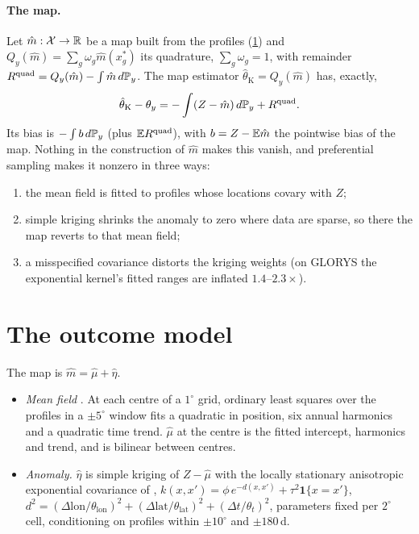 \paragraph{The map.} Let $\hat m:\mathcal{X}\to\mathbb{R}$ be a map built from the profiles (\cref{sec:outcome}) and
$Q_y(\hat m)=\sum_g\omega_g\hat m(x^*_g)$ its quadrature, $\sum_g\omega_g=1$, with remainder
$R^{\mathrm{quad}}=Q_y(\hat m)-\int\hat m\,d\mathbb{P}_y$. The map estimator $\hat\theta_{\mathrm K}=Q_y(\hat m)$
has, exactly,
\begin{equation}\label{eq:krige-error}
  \hat\theta_{\mathrm K}-\theta_y=-\int(Z-\hat m)\,d\mathbb{P}_y+R^{\mathrm{quad}} .
\end{equation}
Its bias is $-\int b\,d\mathbb{P}_y$ (plus $\mathbb{E} R^{\mathrm{quad}}$), with $b=Z-\mathbb{E}\hat m$ the pointwise bias of
the map. Nothing in the construction of $\hat m$ makes this vanish, and preferential sampling makes it
nonzero in three ways:
\begin{enumerate}
  \item the mean field is fitted to profiles whose locations covary with $Z$;
  \item simple kriging shrinks the anomaly to zero where data are sparse, so there the map reverts to
        that mean field;
  \item a misspecified covariance distorts the kriging weights (on GLORYS the exponential kernel's
        fitted ranges are inflated $1.4$--$2.3\times$).
\end{enumerate}

\section{The outcome model}\label{sec:outcome}

The map is $\hat m=\hat\mu+\hat\eta$.
\begin{itemize}
  \item \emph{Mean field} \citep[eq.~5]{sukianto2026}. At each centre of a $1^\circ$ grid, ordinary least
        squares over the profiles in a $\pm5^\circ$ window fits a quadratic in position, six annual
        harmonics and a quadratic time trend. $\hat\mu$ at the centre is the fitted intercept,
        harmonics and trend, and is bilinear between centres.
  \item \emph{Anomaly.} $\hat\eta$ is simple kriging of $Z-\hat\mu$ with the locally stationary
        anisotropic exponential covariance of \citet{kuusela2018},
        $k(x,x')=\phi\,e^{-d(x,x')}+\tau^2\mathbf 1\{x=x'\}$,
        $d^2=(\Delta\mathrm{lon}/\theta_{\mathrm{lon}})^2+(\Delta\mathrm{lat}/\theta_{\mathrm{lat}})^2+(\Delta t/\theta_t)^2$,
        parameters fixed per $2^\circ$ cell, conditioning on profiles within $\pm10^\circ$ and
        $\pm180$\,d.
\end{itemize}

